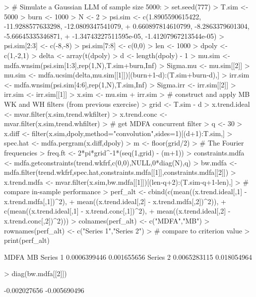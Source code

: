 \documentclass[a4paper]{book}
\begin{document}
\begin{Schunk}
\begin{Sinput}
> # Simulate a Gaussian LLM  of sample size 5000:
> set.seed(777)
> T.sim <- 5000
> burn <- 1000
> N <- 2
> psi.sim <- c(1.8905590615422, -11.9288577633298, -12.0809347541079, 
+              0.660897814610799, -8.2863379601304, -5.66645335346871, 
+              -1.34743227511595e-05, -1.41207967213544e-05)
> psi.sim[2:3] <- c(-8,-8)
> psi.sim[7:8] <- c(0,0)
> len <- 1000
> dpoly <- c(1,-2,1)
> delta <- array(t(dpoly) %
> d <- length(dpoly) - 1
> mu.sim <- mdfa.wnsim(psi.sim[1:3],rep(1,N),T.sim+burn,Inf)
> Sigma.mu <- mu.sim[[2]]
> mu.sim <- mdfa.ucsim(delta,mu.sim[[1]])[(burn+1-d):(T.sim+burn-d),]
> irr.sim <- mdfa.wnsim(psi.sim[4:6],rep(1,N),T.sim,Inf)
> Sigma.irr <- irr.sim[[2]]
> irr.sim <- irr.sim[[1]] 
> x.sim <- mu.sim + irr.sim
> # construct and apply MB WK and WH filters (from previous exercise)
> grid <- T.sim - d
> x.trend.ideal <- mvar.filter(x.sim,trend.wkfilter)
> x.trend.conc <- mvar.filter(x.sim,trend.whfilter)
> # get MDFA concurrent filter
> q <- 30
> x.diff <- filter(x.sim,dpoly,method="convolution",sides=1)[(d+1):T.sim,]
> spec.hat <- mdfa.pergram(x.diff,dpoly)
> m <- floor(grid/2)
> # The Fourier frequencies
> freq.ft <- 2*pi*grid^{-1}*(seq(1,grid) - (m+1))
> constraints.mdfa <- mdfa.getconstraints(trend.wkfrf,c(0,0),NULL,0*diag(N),q)
> bw.mdfa <- mdfa.filter(trend.wkfrf,spec.hat,constraints.mdfa[[1]],constraints.mdfa[[2]])
> x.trend.mdfa <- mvar.filter(x.sim,bw.mdfa[[1]])[(len-q+2):(T.sim-q+1-len),]
> # compare in-sample performance
> perf_alt <- cbind(c(mean((x.trend.ideal[,1] - x.trend.mdfa[,1])^2),
+ 	mean((x.trend.ideal[,2] - x.trend.mdfa[,2])^2)),
+   c(mean((x.trend.ideal[,1] - x.trend.conc[,1])^2),
+ 	mean((x.trend.ideal[,2] - x.trend.conc[,2])^2)))
> colnames(perf_alt) <- c("MDFA","MB")
> rownames(perf_alt) <- c("Series 1","Series 2")
> # compare to criterion value
> print(perf_alt)
\end{Sinput}
\begin{Soutput}
                 MDFA          MB
Series 1 0.0006399446 0.001655656
Series 2 0.0065283115 0.018054964
\end{Soutput}
\begin{Sinput}
> diag(bw.mdfa[[2]])
\end{Sinput}
\begin{Soutput}
[1] -0.002027656 -0.005690496
\end{Soutput}
\end{Schunk}
\end{document}
